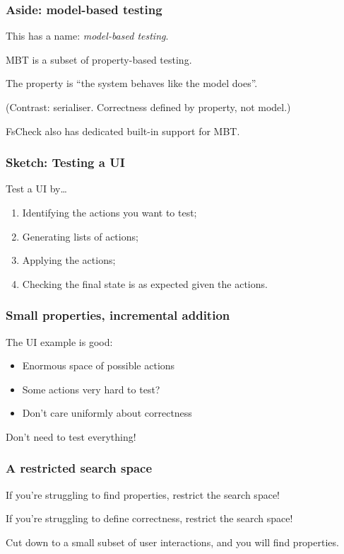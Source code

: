\documentclass{beamer}
\begin{document}
\begin{frame}
\frametitle{Aside: model-based testing}

This has a name: \emph{model-based testing}.

\hfill \break

\noindent{}

\hfill \break

MBT is a subset of property-based testing.

The property is ``the system behaves like the model does''.

(Contrast: serialiser. Correctness defined by property, not model.)

\hfill \break

FsCheck also has dedicated built-in support for MBT.
\end{frame}

\begin{frame}
\frametitle{Sketch: Testing a UI}
Test a UI by\dots
\begin{enumerate}
    \item Identifying the actions you want to test;
    \item Generating lists of actions;
    \item Applying the actions;
    \item Checking the final state is as expected given the actions.
\end{enumerate}
\end{frame}

\begin{frame}
\frametitle{Small properties, incremental addition}

The UI example is good:
\begin{itemize}
\item Enormous space of possible actions
\item Some actions very hard to test?
\item Don't care uniformly about correctness
\end{itemize}

\hfill \break

Don't need to test everything!
\end{frame}

\begin{frame}
\frametitle{A restricted search space}

If you're struggling to find properties, restrict the search space!

If you're struggling to define correctness, restrict the search space!

\hfill \break

Cut down to a small subset of user interactions, and you will find properties.
\end{frame}
\end{document}
